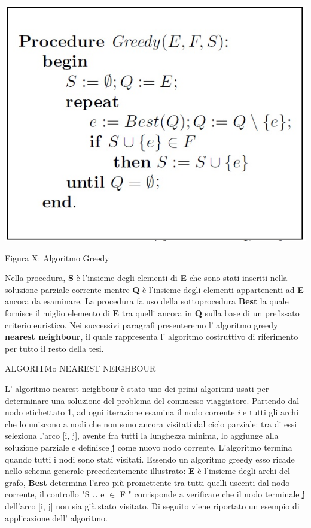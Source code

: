 \documentclass[11pt]{article}
\begin{document}
\begin{center}
\includegraphics[scale=0.5]{ProceduraGreedy}  

Figura X: Algoritmo Greedy 
\end{center}


Nella procedura, \textbf{S} è l'insieme degli elementi di \textbf{E} che sono stati inseriti nella soluzione parziale corrente mentre \textbf{Q} è l'insieme degli elementi appartenenti ad \textbf{E} ancora da esaminare.
La procedura fa uso della sottoprocedura \textbf{Best} la quale fornisce il miglio elemento di \textbf{E} tra quelli ancora in \textbf{Q} sulla base di un prefissato criterio euristico. Nei successivi paragrafi presenteremo l' algoritmo greedy \textbf{nearest neighbour}, il quale rappresenta l' algoritmo costruttivo di riferimento per tutto il resto della tesi.

\vspace{2\baselineskip}
ALGORITMo NEAREST NEIGHBOUR
\vspace{2\baselineskip}

L' algoritmo nearest neighbour è stato uno dei primi algoritmi usati per determinare una soluzione del problema del commesso viaggiatore.
Partendo dal nodo etichettato 1, ad ogni iterazione esamina il nodo corrente \textit{i} e tutti gli archi che lo uniscono a nodi che non sono ancora visitati dal ciclo parziale: tra di essi seleziona l'arco [i, j], avente fra tutti la lunghezza minima, lo aggiunge alla soluzione parziale e definisce \textbf{j} come nuovo nodo corrente. L'algoritmo termina quando tutti i nodi sono stati visitati. 
Essendo un algoritmo greedy esso ricade nello schema generale precedentemente illustrato:\textbf{ E} è l'insieme degli archi del grafo, \textbf{Best} determina l'arco più promettente tra tutti quelli uscenti dal nodo corrente, il controllo "S $ \cup $ {e} $\in$ F " corrisponde a verificare che il nodo terminale \textbf{j} dell'arco [i, j] non sia già stato visitato.
Di seguito viene riportato un esempio di applicazione dell' algoritmo.
\end{document}

